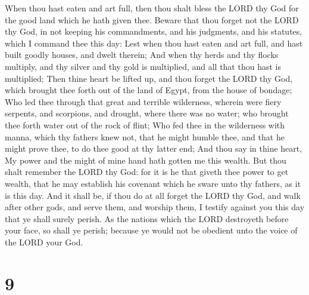  When thou hast eaten and art full, then thou shalt bless
the LORD thy God for the good land which he hath given thee.
 Beware that thou forget not the LORD thy God, in not
keeping his commandments, and his judgments, and his statutes, which I
command thee this day:  Lest when thou hast eaten and art
full, and hast built goodly houses, and dwelt therein;  And
when thy herds and thy flocks multiply, and thy silver and thy gold is
multiplied, and all that thou hast is multiplied;  Then
thine heart be lifted up, and thou forget the LORD thy God, which
brought thee forth out of the land of Egypt, from the house of bondage;
 Who led thee through that great and terrible wilderness,
wherein were fiery serpents, and scorpions, and drought, where there was
no water; who brought thee forth water out of the rock of flint;
 Who fed thee in the wilderness with manna, which thy
fathers knew not, that he might humble thee, and that he might prove
thee, to do thee good at thy latter end;  And thou say in
thine heart, My power and the might of mine hand hath gotten me this
wealth.  But thou shalt remember the LORD thy God: for it
is he that giveth thee power to get wealth, that he may establish his
covenant which he sware unto thy fathers, as it is this day.
 And it shall be, if thou do at all forget the LORD thy
God, and walk after other gods, and serve them, and worship them, I
testify against you this day that ye shall surely perish. 
As the nations which the LORD destroyeth before your face, so shall ye
perish; because ye would not be obedient unto the voice of the LORD your
God.

\hypertarget{section-8}{%
\section{9}\label{section-8}}

